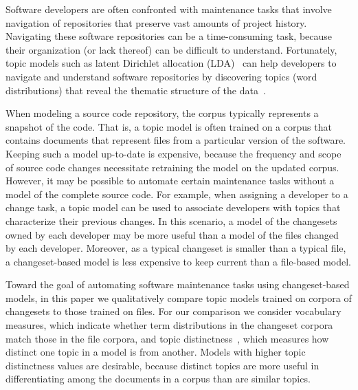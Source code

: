 Software developers are often confronted with maintenance tasks that involve navigation of repositories that preserve vast amounts of project history.
 Navigating these software repositories can be a time-consuming task, because their organization (or lack thereof) can be difficult to understand.
 Fortunately, topic models such as latent Dirichlet allocation (LDA)~\cite{Blei-etal:2003} can help developers to navigate and understand software repositories by discovering topics (word distributions) that reveal the thematic structure of the data~\cite{Linstead-etal:2007,Thomas-etal:2011,Hindle_etal:2012}.


When modeling a source code repository, the corpus typically represents a snapshot of the code.
 That is, a topic model is often trained on a corpus that contains documents that represent files from a particular version of the software.
 Keeping such a model up-to-date is expensive, because the frequency and scope of source code changes necessitate retraining the model on the updated corpus.
 However, it may be possible to automate certain maintenance tasks without a model of the complete source code.
For example, when assigning a developer to a change task, a topic model can be used to associate developers with topics that characterize their previous changes.
In this scenario, a model of the changesets owned by each developer may be more useful than a model of the files changed by each developer.
 Moreover, as a typical changeset is smaller than a typical file, a changeset-based model is less expensive to keep current than a file-based model.



Toward the goal of automating software maintenance tasks using changeset-based models, in this paper we qualitatively compare topic models trained on corpora of changesets to those trained on files.
 For our comparison we consider vocabulary measures, which indicate whether term distributions in the changeset corpora match those in the file corpora, and topic distinctness~\cite{Wei-etal:2010,Thomas-etal:2011,Chuang-etal:2012}, which measures how distinct one topic in a model is from another.
 Models with higher topic distinctness values are desirable, because distinct topics are more useful in differentiating among the documents in a corpus than are similar topics.

